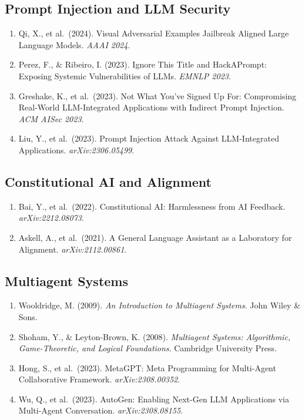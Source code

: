 \documentclass[
]{article}
\begin{document}
\subsection{Prompt Injection and LLM
Security}\label{prompt-injection-and-llm-security}

\begin{enumerate}
\def\labelenumi{\arabic{enumi}.}
\item
  Qi, X., et al.~(2024). Visual Adversarial Examples Jailbreak Aligned
  Large Language Models. \emph{AAAI 2024}.
\item
  Perez, F., \& Ribeiro, I. (2023). Ignore This Title and HackAPrompt:
  Exposing Systemic Vulnerabilities of LLMs. \emph{EMNLP 2023}.
\item
  Greshake, K., et al.~(2023). Not What You've Signed Up For:
  Compromising Real-World LLM-Integrated Applications with Indirect
  Prompt Injection. \emph{ACM AISec 2023}.
\item
  Liu, Y., et al.~(2023). Prompt Injection Attack Against LLM-Integrated
  Applications. \emph{arXiv:2306.05499}.
\end{enumerate}

\subsection{Constitutional AI and
Alignment}\label{constitutional-ai-and-alignment}

\begin{enumerate}
\def\labelenumi{\arabic{enumi}.}
\item
  Bai, Y., et al.~(2022). Constitutional AI: Harmlessness from AI
  Feedback. \emph{arXiv:2212.08073}.
\item
  Askell, A., et al.~(2021). A General Language Assistant as a
  Laboratory for Alignment. \emph{arXiv:2112.00861}.
\end{enumerate}

\subsection{Multiagent Systems}\label{multiagent-systems}

\begin{enumerate}
\def\labelenumi{\arabic{enumi}.}
\item
  Wooldridge, M. (2009). \emph{An Introduction to Multiagent Systems}.
  John Wiley \& Sons.
\item
  Shoham, Y., \& Leyton-Brown, K. (2008). \emph{Multiagent Systems:
  Algorithmic, Game-Theoretic, and Logical Foundations}. Cambridge
  University Press.
\item
  Hong, S., et al.~(2023). MetaGPT: Meta Programming for Multi-Agent
  Collaborative Framework. \emph{arXiv:2308.00352}.
\item
  Wu, Q., et al.~(2023). AutoGen: Enabling Next-Gen LLM Applications via
  Multi-Agent Conversation. \emph{arXiv:2308.08155}.
\end{enumerate}
\end{document}
